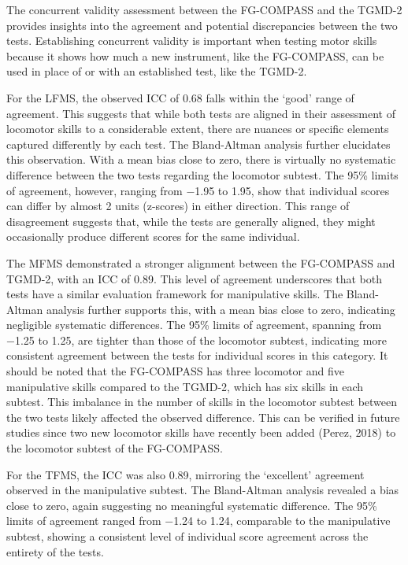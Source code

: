 \documentclass[
  man,
  colorlinks=true,linkcolor=blue,citecolor=blue,urlcolor=blue]{apa7}
\begin{document}
The concurrent validity assessment between the FG-COMPASS and the TGMD-2
provides insights into the agreement and potential discrepancies between
the two tests. Establishing concurrent validity is important when
testing motor skills because it shows how much a new instrument, like
the FG-COMPASS, can be used in place of or with an established test,
like the TGMD-2.

For the LFMS, the observed ICC of 0.68 falls within the `good' range of
agreement. This suggests that while both tests are aligned in their
assessment of locomotor skills to a considerable extent, there are
nuances or specific elements captured differently by each test. The
Bland-Altman analysis further elucidates this observation. With a mean
bias close to zero, there is virtually no systematic difference between
the two tests regarding the locomotor subtest. The 95\% limits of
agreement, however, ranging from −1.95 to 1.95, show that individual
scores can differ by almost 2 units (z-scores) in either direction. This
range of disagreement suggests that, while the tests are generally
aligned, they might occasionally produce different scores for the same
individual.

The MFMS demonstrated a stronger alignment between the FG-COMPASS and
TGMD-2, with an ICC of 0.89. This level of agreement underscores that
both tests have a similar evaluation framework for manipulative skills.
The Bland-Altman analysis further supports this, with a mean bias close
to zero, indicating negligible systematic differences. The 95\% limits
of agreement, spanning from −1.25 to 1.25, are tighter than those of the
locomotor subtest, indicating more consistent agreement between the
tests for individual scores in this category. It should be noted that
the FG-COMPASS has three locomotor and five manipulative skills compared
to the TGMD-2, which has six skills in each subtest. This imbalance in
the number of skills in the locomotor subtest between the two tests
likely affected the observed difference. This can be verified in future
studies since two new locomotor skills have recently been added (Perez,
2018) to the locomotor subtest of the FG-COMPASS.

For the TFMS, the ICC was also 0.89, mirroring the `excellent' agreement
observed in the manipulative subtest. The Bland-Altman analysis revealed
a bias close to zero, again suggesting no meaningful systematic
difference. The 95\% limits of agreement ranged from −1.24 to 1.24,
comparable to the manipulative subtest, showing a consistent level of
individual score agreement across the entirety of the tests.
\end{document}

